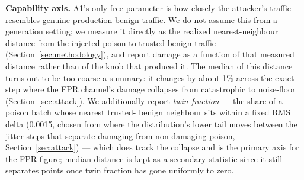 \textbf{Capability axis.} A1's only free parameter is how closely the attacker's traffic
resembles genuine production benign traffic. We do not assume this from a generation setting;
we measure it directly as the realized nearest-neighbour distance from the injected poison to
trusted benign traffic (Section~\ref{sec:methodology}), and report damage as a function of that
measured distance rather than of the knob that produced it. The median of this distance turns
out to be too coarse a summary: it changes by about 1\% across the exact step where the FPR
channel's damage collapses from catastrophic to noise-floor (Section~\ref{sec:attack}). We
additionally report \emph{twin fraction} — the share of a poison batch whose nearest trusted-
benign neighbour sits within a fixed RMS delta (0.0015, chosen from where the distribution's
lower tail moves between the jitter steps that separate damaging from non-damaging poison,
Section~\ref{sec:attack}) — which does track the collapse and is the primary axis for the FPR
figure; median distance is kept as a secondary statistic since it still separates points once
twin fraction has gone uniformly to zero.
